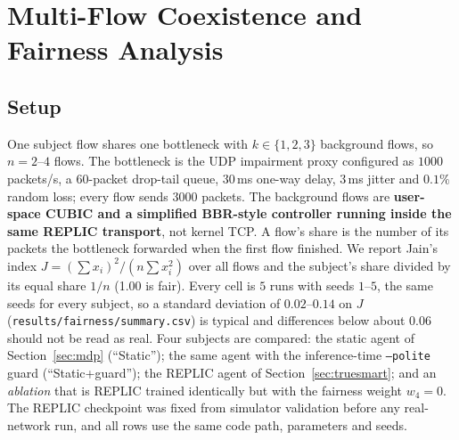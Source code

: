 \section{Multi-Flow Coexistence and Fairness Analysis}
\label{sec:fairness}

\subsection{Setup}
One subject flow shares one bottleneck with $k\in\{1,2,3\}$ background flows, so $n=2$--$4$ flows. The bottleneck is the UDP impairment proxy configured as $1000$ packets/s, a $60$-packet drop-tail queue, $30$\,ms one-way delay, $3$\,ms jitter and $0.1\%$ random loss; every flow sends $3000$ packets. The background flows are \textbf{user-space CUBIC and a simplified BBR-style controller running inside the same REPLIC transport}, not kernel TCP. A flow's share is the number of its packets the bottleneck forwarded when the first flow finished. We report Jain's index $J=(\sum x_i)^2/(n\sum x_i^2)$ over all flows and the subject's share divided by its equal share $1/n$ (1.00 is fair). Every cell is $5$ runs with seeds $1$--$5$, the same seeds for every subject, so a standard deviation of $0.02$--$0.14$ on $J$ (\texttt{results/fairness/summary.csv}) is typical and differences below about $0.06$ should not be read as real.
Four subjects are compared: the static agent of Section~\ref{sec:mdp} (``Static''); the same agent with the inference-time \texttt{--polite} guard (``Static+guard''); the REPLIC agent of Section~\ref{sec:truesmart}; and an \emph{ablation} that is REPLIC trained identically but with the fairness weight $w_4=0$.
The REPLIC checkpoint was fixed from simulator validation before any real-network run, and all rows use the same code path, parameters and seeds.

